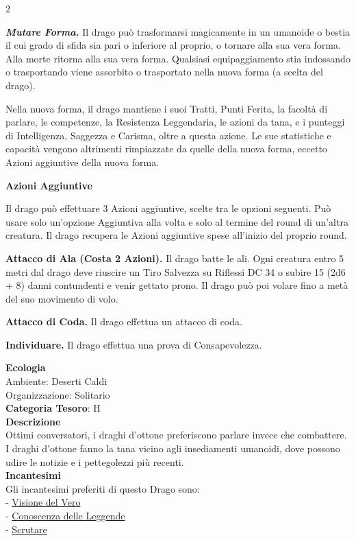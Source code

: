 \begin{multicols}{2}
{\emph{\textbf{Mutare Forma.}} Il drago può trasformarsi magicamente in un umanoide o bestia il cui grado di sfida sia pari o inferiore al proprio, o tornare alla sua vera forma. Alla morte ritorna alla sua vera forma. Qualsiasi equipaggiamento stia indossando o trasportando viene assorbito o trasportato nella nuova forma (a scelta del drago).

Nella nuova forma, il drago mantiene i suoi Tratti, Punti Ferita, la facoltà di parlare, le competenze, la Resistenza Leggendaria, le azioni da tana, e i punteggi di Intelligenza, Saggezza e Carisma, oltre a questa azione. Le sue statistiche e capacità vengono altrimenti rimpiazzate da quelle della nuova forma, eccetto Azioni aggiuntive della nuova forma.

\textbf{Azioni Aggiuntive}

Il drago può effettuare 3 Azioni aggiuntive, scelte tra le opzioni seguenti. Può usare solo un'opzione Aggiuntiva alla volta e solo al termine del round di un'altra creatura. Il drago recupera le Azioni aggiuntive spese all'inizio del proprio round.

\textbf{Attacco di Ala (Costa 2 Azioni).} Il drago batte le ali. Ogni creatura entro 5 metri dal drago deve riuscire un Tiro Salvezza su Riflessi DC 34 o subire 15 (2d6 + 8) danni contundenti e venir gettato prono. Il drago può poi volare fino a metà del suo movimento di volo.

\textbf{Attacco di Coda.} Il drago effettua un attacco di coda.

\textbf{Individuare.} Il drago effettua una prova di Consapevolezza.

\textbf{Ecologia}\\
Ambiente: Deserti Caldi\\
Organizzazione: Solitario\\
\textbf{Categoria Tesoro}: H\\
\textbf{Descrizione}\\
Ottimi conversatori, i draghi d'ottone preferiscono parlare invece che combattere. I draghi d'ottone fanno la tana vicino agli insediamenti umanoidi, dove possono udire le notizie e i pettegolezzi più recenti.\\
\textbf{Incantesimi}\\
Gli incantesimi preferiti di questo Drago sono:\\
- \hyperlink{Visione del Vero}{Visione del Vero}\\
- \hyperlink{Conoscenza delle Leggende}{Conoscenza delle Leggende}\\
- \hyperlink{Scrutare}{Scrutare}

}
\end{multicols}
